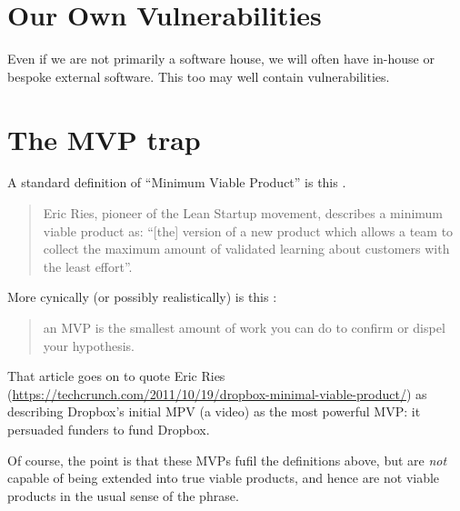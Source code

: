 \documentclass{article}
\begin{document}
\section{Our Own Vulnerabilities}
Even if we are not primarily a software house, we will often have in-house or bespoke external software. This too may well contain vulnerabilities.
\section{The MVP trap}
A standard definition of ``Minimum Viable Product'' is this \cite{BL2016a}.
\begin{quote}
Eric Ries, pioneer of the Lean Startup movement, describes a minimum viable product as: ``[the] version of a new product which allows a team to collect the maximum amount of validated learning about customers with the least effort''.
\end{quote}
More cynically (or possibly realistically) is this \cite{Kamps2022a}: 
\begin{quote}
an MVP is the smallest amount of work you can do to confirm or dispel your hypothesis.
\end{quote}
That article goes on to quote Eric Ries (\url{https://techcrunch.com/2011/10/19/dropbox-minimal-viable-product/}) as describing Dropbox's initial MPV (a video) as the most powerful MVP: it persuaded funders to fund Dropbox.
\par
Of course, the point is that these MVPs fufil the definitions above, but are \emph{not} capable of being extended into true viable products, and hence are not viable products in the usual sense of the phrase.
\end{document}
